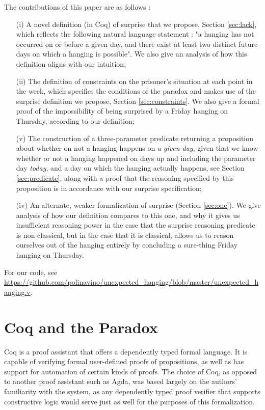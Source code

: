 \documentclass[runningheads]{llncs}
\begin{document}
  The contributions of this paper are as follows :

  \begin{itemize}
    \item[(i)] A novel definition (in Coq) of surprise that we propose,
    Section \ref{sec:lack}, which reflects
    the following natural language statement : "a hanging has not occurred on or before a given day,
    and there exist at least two distinct future days on which a hanging
    is possible". We
    also give an analysis of how this definition aligns with our intuition;

    \item[(ii)] The definition of constraints on the prisoner's situation at each
    point in the week, which specifies the conditions of the paradox and makes use
    of the surprise definition we propose, Section \ref{sec:constraints}. We also
    give a formal proof of the impossibility of being surprised by a Friday hanging
    on Thursday, according to our definition;

    \item[(v)] The construction of a three-parameter predicate returning a proposition about
    whether on not a hanging happens on \emph{a given day}, given that we know whether or not a hanging
    happened on days up and including the parameter day \emph{today}, and a day on which the hanging
    actually happens, see Section \ref{sec:predicate}, along with a proof that the reasoning specified by
    this proposition is in accordance with our surprise specification;

    \item[(iv)] An alternate, weaker formalization of surprise (Section \ref{sec:one}). We give analysis of how
    our definition compares to this one, and why it gives us insufficient reasoning
    power in the case that the surprise reasoning predicate is non-classical, but
    in the case that it is classical, allows us to reason ourselves out of the hanging entirely by concluding
    a sure-thing Friday hanging on Thursday.
  \end{itemize}

  For our code, see \url{https://github.com/polinavino/unexpected_hanging/blob/master/unexpected_hanging.v}.

\section{Coq and the Paradox}
\label{sec:form}

Coq is a proof assistant that offers a dependently typed formal language.
It is capable of verifying formal user-defined proofs of propositions, as well as has support
for automation of certain kinds of proofs. The choice of Coq, as opposed to another
proof assistant such as Agda, was based largely on the authors' familiarity with the system,
as any dependently typed proof verifier that supports constructive logic
would serve just as well for the purposes of this formalization.
\end{document}
